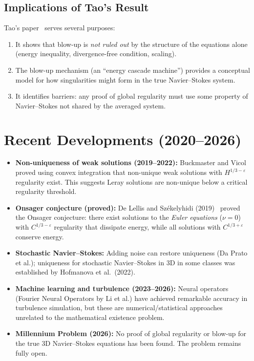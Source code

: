 \documentclass[12pt,a4paper]{article}
\theoremstyle{remark}
\begin{document}
\subsection{Implications of Tao's Result}

Tao's paper~\cite{Tao2016} serves several purposes:
\begin{enumerate}[nosep]
  \item It shows that blow-up is \emph{not ruled out} by the structure of the equations
    alone (energy inequality, divergence-free condition, scaling).
  \item The blow-up mechanism (an ``energy cascade machine'') provides a conceptual model
    for how singularities might form in the true Navier--Stokes system.
  \item It identifies barriers: any proof of global regularity must use some property
    of Navier--Stokes not shared by the averaged system.
\end{enumerate}

\section{Recent Developments (2020--2026)}

\begin{itemize}[nosep]
  \item \textbf{Non-uniqueness of weak solutions (2019--2022):} Buckmaster and
    Vicol~\cite{BuckmasterVicol2019} proved using convex integration that non-unique
    weak solutions with $H^{1/3-\varepsilon}$ regularity exist.  This suggests Leray
    solutions are non-unique below a critical regularity threshold.
  \item \textbf{Onsager conjecture (proved):} De Lellis and Székelyhidi (2019)~\cite{DeLellis2019}
    proved the Onsager conjecture: there exist solutions to the \emph{Euler equations}
    ($\nu=0$) with $C^{1/3-\varepsilon}$ regularity that dissipate energy, while all
    solutions with $C^{1/3+\varepsilon}$ conserve energy.
  \item \textbf{Stochastic Navier--Stokes:} Adding noise can restore uniqueness (Da Prato
    et al.); uniqueness for stochastic Navier--Stokes in 3D in some classes was
    established by Hofmanova et al.\ (2022).
  \item \textbf{Machine learning and turbulence (2023--2026):} Neural operators (Fourier
    Neural Operators by Li et al.) have achieved remarkable accuracy in turbulence
    simulation, but these are numerical/statistical approaches unrelated to the mathematical
    existence problem.
  \item \textbf{Millennium Problem (2026):} No proof of global regularity or blow-up for
    the true 3D Navier--Stokes equations has been found.  The problem remains fully open.
\end{itemize}
\end{document}
